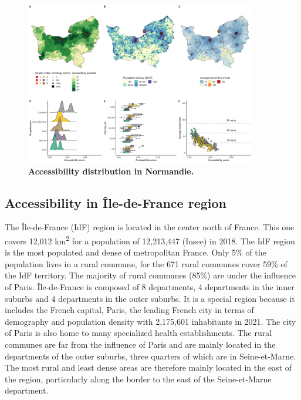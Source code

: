\begin{figure}[h!]
    \includegraphics[width=0.9\textwidth]{images/camion/region_accessibility/accessibility_Normandie.png}
    \centering
    \caption{
        \textbf{Accessibility distribution in Normandie.}
    }
\end{figure}

\subsection*{Accessibility in Île-de-France region}

The Île-de-France (IdF) region is located in the center north of France. This
one covers 12,012 km\textsuperscript{2} for a population of 12,213,447 (Insee)
in 2018. The IdF region is the most populated and dense of metropolitan France.
Only 5\% of the population lives in a rural commune, for the 671 rural communes
cover 59\% of the IdF territory. The majority of rural communes (85\%) are under
the influence of Paris. Île-de-France is composed of 8 departments, 4
departments in the inner suburbs and 4 departments in the outer suburbs. It is a
special region because it includes the French capital, Paris, the leading French
city in terms of demography and population density with 2,175,601 inhabitants in
2021. The city of Paris is also home to many specialized health establishments.
The rural communes are far from the influence of Paris and are mainly located in
the departments of the outer suburbs, three quarters of which are in
Seine-et-Marne. The most rural and least dense areas are therefore mainly
located in the east of the region, particularly along the border to the east of
the Seine-et-Marne department.

